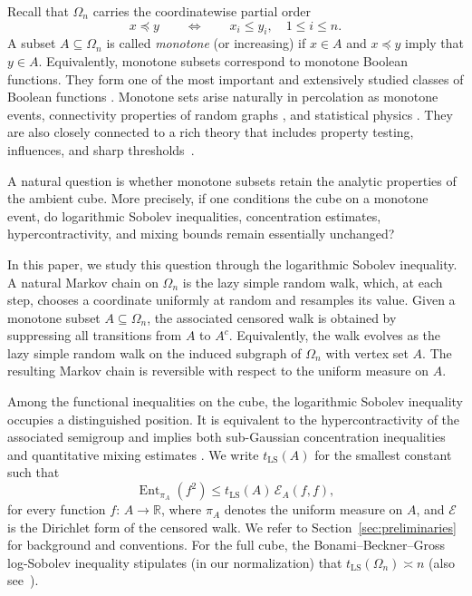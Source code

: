 \documentclass[12pt,final]{amsart}
\newcommand{\1}{\mathbf{1}}
\newcommand{\Ent}{\operatorname{Ent}}
\newcommand{\Ecal}{\mathcal{E}}
\newcommand{\R}{\mathbb{R}}
\begin{document}
Recall that $\Omega_n$ carries the coordinatewise partial order 
$$
x\preceq y\qquad \Longleftrightarrow \qquad x_i\le y_i,\quad 1\le i\le n.
$$
A subset $A\subseteq \Omega_n$ is called \emph{monotone} (or increasing) if $x\in A$ and $x\preceq y$ imply that $y\in A$. Equivalently, monotone subsets correspond to monotone Boolean functions. They form one of the most important and extensively studied classes of Boolean functions \cite{ODon14}. 
Monotone sets arise naturally in percolation \cite{BR06, Grim89} as monotone events, connectivity properties of random graphs \cite{Bollobas}, and statistical physics \cite{FKG, G06}. They are also closely connected to a rich theory that includes property testing, influences, and sharp thresholds~\cite{FK96, KKL88, KS06, GGLRS}. 

A natural question is whether monotone subsets retain the analytic properties of the ambient cube. More precisely, if one conditions the cube on a monotone event, do logarithmic Sobolev inequalities, concentration estimates, hypercontractivity, and mixing bounds remain essentially unchanged? 

In this paper, we study this question through the logarithmic Sobolev inequality. A natural Markov chain on $\Omega_n$ is the lazy simple random walk, which, at each step, chooses a coordinate uniformly at random and resamples its value. Given a monotone subset $A\subseteq \Omega_n$, the associated censored walk is obtained by suppressing all transitions from $A$ to $A^c$.  Equivalently, the walk evolves as the lazy simple random walk on the induced subgraph of $\Omega_n$ with vertex set $A$. The resulting Markov chain is reversible with respect to the uniform measure on $A$. 

Among the functional inequalities on the cube, the logarithmic Sobolev inequality occupies a distinguished position. It is equivalent to the hypercontractivity of the associated semigroup \cite{Gross} and implies both sub-Gaussian concentration inequalities \cite{Led99Concentration, BLM} and quantitative mixing estimates \cite{Dia96LSI, S-C97}. We write $t_{\operatorname{LS}}(A)$ for the smallest constant such that 
$$
\Ent_{\pi_A}(f^2)\leq t_{\operatorname{LS}}(A)\, \Ecal_{A}(f,f),
$$
for every function $f:\, A\to \R$, where $\pi_A$ denotes the uniform measure on $A$, and $\Ecal$ is the Dirichlet form of the censored walk. We refer to Section~\ref{sec:preliminaries} for background and conventions. For the full cube, the Bonami--Beckner--Gross~\cite{Bon,Beck,Gross} log-Sobolev inequality stipulates (in our normalization) that $t_{\operatorname{LS}}(\Omega_n)\asymp n$ (also see~\cite[Example 3.6]{salez2025modern}).
\end{document}
